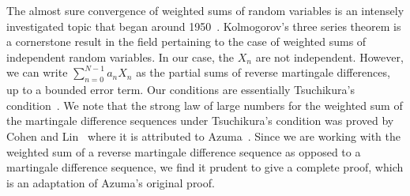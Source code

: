 \documentclass[12pt, reqno, final, a4paper]{amsart}
\theoremstyle{plain}
\theoremstyle{definition}
\theoremstyle{remark}
\newcommand{\1}{\mathbf 1}
\begin{document}
The almost sure convergence of weighted sums of random variables is an intensely investigated topic that began around 1950~\cite{Tsuchi51, MR13435, JOP, Heyde, MR221571}. Kolmogorov's three series theorem is a cornerstone result in the field pertaining to the case of weighted sums of independent random variables. In our case, the $X_n$ are not independent. However, we can write $\sum_{n=0}^{N-1}a_nX_n$ as the partial sums of reverse martingale differences, up to a bounded error term.  Our conditions are essentially Tsuchikura's condition~\cite{Tsuchi51}. We note that the strong law of large numbers for the weighted sum of the martingale difference sequences under Tsuchikura's condition was proved by Cohen and Lin~\cite[Corollary 4.12]{CohenLin09} where it is attributed to Azuma~\cite{MR221571}. Since we are working with the weighted sum of a reverse martingale difference sequence as opposed to a martingale difference sequence, we find it prudent to give a complete proof, which is an adaptation of Azuma's original proof.
\end{document}
